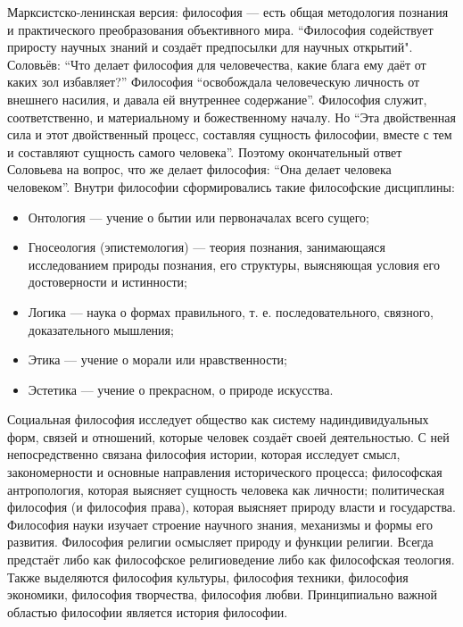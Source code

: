 \documentclass[12pt]{article}
\begin{document}
Марксистско-ленинская версия:  философия --- есть  общая  методология  познания  и  практического  преобразования  объективного  мира.
``Философия содействует приросту научных знаний и создаёт предпосылки для научных открытий".
Соловьёв: “Что делает философия для человечества, какие блага ему даёт от каких зол избавляет?” 
Философия “освобождала человеческую личность от внешнего насилия, и давала ей внутреннее содержание”.
Философия служит, соответственно, и материальному и божественному началу. Но “Эта двойственная сила и
этот двойственный  процесс,  составляя  сущность философии,  вместе с тем и составляют сущность самого
человека”. Поэтому окончательный ответ Соловьева на вопрос, что же делает философия: “Она делает человека
человеком”.
Внутри философии сформировались такие философские дисциплины:
\begin{itemize}
  \item Онтология --- учение о бытии или первоначалах всего сущего;
  \item Гносеология (эпистемология) --- теория  познания,  занимающаяся  исследованием  природы  познания,  его
структуры, выясняющая условия его достоверности и истинности;
\item Логика --- наука о формах правильного, т. е. последовательного, связного, доказательного мышления;
\item Этика --- учение о морали или нравственности;
\item Эстетика --- учение о прекрасном, о природе искусства.
\end{itemize}
  Социальная  философия  исследует  общество  как  систему  надиндивидуальных  форм,  связей  и  отношений,
которые человек создаёт своей деятельностью. С ней непосредственно связана философия истории, которая
исследует  смысл,  закономерности  и  основные  направления  исторического  процесса;  философская
антропология,  которая  выясняет  сущность  человека  как  личности;  политическая  философия  (и  философия
права), которая выясняет природу власти и государства. Философия науки изучает строение научного знания,
механизмы  и  формы  его  развития.  Философия  религии  осмысляет  природу  и  функции  религии.  Всегда
предстаёт  либо  как  философское  религиоведение  либо  как  философская  теология.  Также  выделяются
философия культуры, философия техники, философия экономики, философия творчества, философия любви. 
Принципиально важной областью философии является история философии.

\newpage
\end{document}
